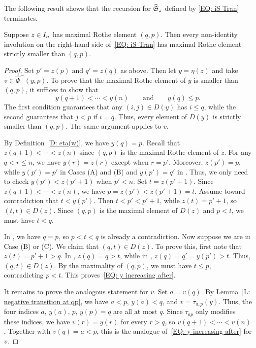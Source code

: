 \documentclass[10pt]{article}
\begin{document}
The following result shows that the recursion for $\widehat{\mathfrak S}_z$ defined by \eqref{EQ: iS Tran}
terminates.

\begin{lemma}
\label{L: inv transition order}
Suppose $ z \in I_n$ has maximal Rothe element $(q,p)$.
Then every non-identity involution on the right-hand side
of~\eqref{EQ: iS Tran}
has maximal Rothe element strictly smaller than $(q,p)$.
\end{lemma}

\begin{proof}
Set $p'=z(p)$ and $q'=z(q)$ as above. Then let $y=\eta(z)$ and take
$v\in\hat\Phi^{-}(y,p)$.
To prove that the maximal Rothe element of $y$
is smaller than $(q,p)$, it suffices to show that
\begin{equation}
\label{EQ: y increasing after}
y(q+1)<\cdots<y(n)
\qquad\text{and}\qquad
y(q)\leq p.
\end{equation}
The first condition guarantees that
any $(i,j)\in D(y)$ has $i\leq q$,
while the second guarantees that $j<p$
if $i=q$.
Thus, every element of $D(y)$ is strictly smaller
than $(q,p)$.
The same argument applies to $v$.

By Definition~\ref{D: eta(w)}, we have $y(q)=p$.
Recall that
$z(q+1)<\cdots<z(n)$
since $(q,p)$ is the maximal Rothe element of $z$.
For any $q<r\leq n$, we have $y(r)=z(r)$
except when $r=p'$.
Moreover, $z(p')=p$, while
$y(p')=p'$ in Cases (A) and (B)
 and $y(p')=q'$ in \CaseC.
Thus, we only need to check
$y(p')<z(p'+1)$ when $p'<n$.
Set $t=z(p'+1)$.
Since $z(q+1)<\cdots<z(n)$,
we have $p=z(p')<z(p'+1)=t$.
Assume toward contradiction that $t<y(p')$.
Then $t<p'<p'+1$, while $z(t)=p'+1$,
so $(t,t)\in D(z)$.
Since $(q,p)$ is the maximal element of $D(z)$
and $p<t$, we must have $t<q$.

In \CaseA, we have $q=p$,
so $p<t<q$ is already a contradiction.
Now suppose we are in Case (B) or (C).
We claim that $(q,t)\in D(z)$.
To prove this, first note that $z(t)=p'+1>q$.
In \CaseB, $z(q)=q>t$,
while in \CaseC,
$z(q)=q'=y(p')>t$.
Thus, $(q,t)\in D(z)$.
By the maximality of $(q,p)$, we must have $t\leq p$,
contradicting $p<t$.
This proves~\eqref{EQ: y increasing after}.

It remains to prove the analogous statement for $v$.
Set $a=v(q)$.
By Lemma~\ref{L: negative transition at qp},
we have $a<p$, $y(a)<q$, and
$v=\tau_{a,p}(y)$.
Thus, the four indices
$a$, $y(a)$, $p$, $y(p)=q$
are all at most $q$.
Since $\tau_{ap}$ only modifies these indices,
we have $v(r)=y(r)$ for every $r>q$,
so $v(q+1)<\cdots<v(n)$.
Together with $v(q)=a<p$,
this is the analogue of~\eqref{EQ: y increasing after}
for $v$.
\end{proof}
\end{document}

